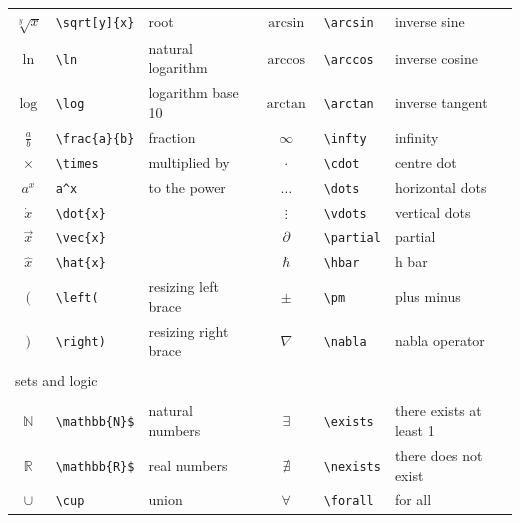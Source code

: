 \begin{table}[ht!]
\begin{tabular}{cll|cll}
        $\sqrt[y]{x}$	    &	\verb|\sqrt[y]{x}|	    & root	        &	$\arcsin$	        &	\verb|\arcsin|	        &	inverse sine	    \\
        $\ln$	        &	\verb|\ln|	        &	natural logarithm	&	$\arccos$	        &	\verb|\arccos|	        &	inverse cosine	    \\
        $\log$	        &	\verb|\log|	        &	logarithm base 10	&	$\arctan$	        &	\verb|\arctan|	        &	inverse tangent	    \\
        $\frac{a}{b}$	&	\verb|\frac{a}{b}|	&	fraction    	    &	$\infty$	        &	\verb|\infty|	        &	infinity	        \\
        $\times$	    &	\verb|\times|	    &	multiplied by	    &	$\cdot$	            &	\verb|\cdot|	        &	centre dot	        \\
        $a^x$	        &	\verb|a^x|	        &	to the power	    &	$\dots$	            &	\verb|\dots|	        &	horizontal dots	    \\
        $\dot{x}$   	&	\verb|\dot{x}|	    &		                &	$\vdots$	        &	\verb|\vdots|	        &	vertical dots	    \\
        $\vec{x}$	    &	\verb|\vec{x}|	    &		                &	$\partial$	        &	\verb|\partial|	        &	partial	            \\
        $\hat{x}$	    &	\verb|\hat{x}|	    &		                &	$\hbar$	            &	\verb|\hbar|	        &	h bar	            \\
        $\left(\right.$	&	\verb|\left(|	    &	resizing left brace	&	$\pm$	            &	\verb|\pm|	            &   plus minus          \\
        $\left.\right)$	&	\verb|\right)|	    &	resizing right brace&	$\nabla$	        &	\verb|\nabla|	        &	nabla operator		\\
        \\\multicolumn{2}{l}{sets and logic}	&		                &		                &		                    &		                \\\\
        $\mathbb{N}$	&	\verb|\mathbb{N}$|	&	natural numbers	    &	$\exists$	        &	\verb|\exists|	        &	there exists at least 1	\\
        $\mathbb{R}$	&	\verb|\mathbb{R}$|	&	real numbers	    &	$\nexists$	        &	\verb|\nexists|	        &	there does not exist	\\
        $\cup$	        &	\verb|\cup|	        &	union	            &	$\forall$	        &	\verb|\forall|	        &	for all	            \\

\end{tabular}
\end{table}
